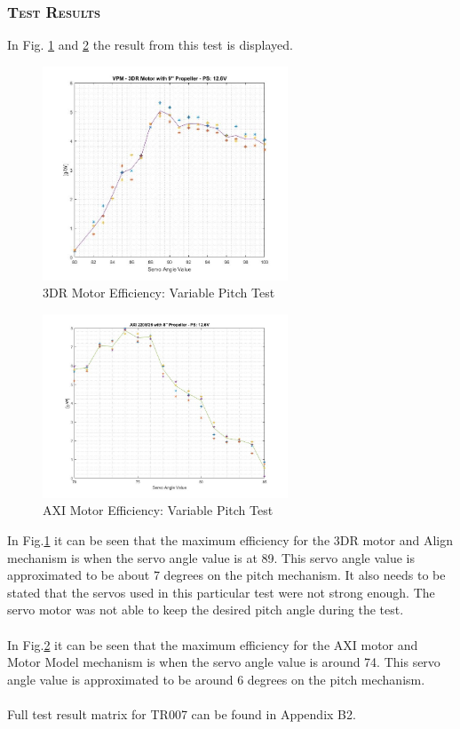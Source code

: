 \subsubsection*{\textsc{\medium Test Results}}
In Fig. \ref{fig:vpm1} and \ref{fig:vpm2} the result from this test is displayed. 
\begin{figure}[H]
    \centering
    \includegraphics[width = 0.65\textwidth]{VAPIQ-PICTURES/VPM1}
    \caption{3DR Motor Efficiency: Variable Pitch Test}
    \label{fig:vpm1}
\end{figure}
\begin{figure}[H]
    \centering
    \includegraphics[width = 0.65\textwidth]{VAPIQ-PICTURES/VPM2}
    \caption{AXI Motor Efficiency: Variable Pitch Test}
    \label{fig:vpm2}
\end{figure}

\noindent
In Fig.\ref{fig:vpm1} it can be seen that the maximum efficiency for the 3DR motor and Align mechanism is when the servo angle value is at 89. This servo angle value is approximated to be about 7 degrees on the pitch mechanism. It also needs to be stated that the servos used in this particular test were not strong enough. The servo motor was not able to keep the desired pitch angle during the test. \\
\\
In Fig.\ref{fig:vpm2} it can be seen that the maximum efficiency for the AXI motor and Motor Model mechanism is when the servo angle value is around 74. This servo angle value is approximated to be around 6 degrees on the pitch mechanism.\\
\\
Full test result matrix for TR007 can be found in Appendix B2.
\newpage